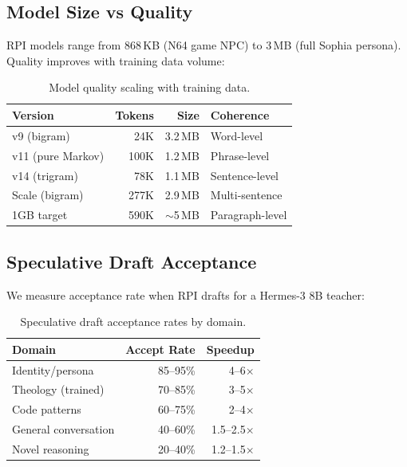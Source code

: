 \documentclass[10pt,twocolumn]{article}
\begin{document}
\subsection{Model Size vs Quality}

RPI models range from 868\,KB (N64 game NPC) to 3\,MB (full Sophia persona). Quality improves with training data volume:

\begin{table}[h]
\centering
\small
\begin{tabular}{lrrl}
\toprule
\textbf{Version} & \textbf{Tokens} & \textbf{Size} & \textbf{Coherence} \\
\midrule
v9 (bigram) & 24K & 3.2\,MB & Word-level \\
v11 (pure Markov) & 100K & 1.2\,MB & Phrase-level \\
v14 (trigram) & 78K & 1.1\,MB & Sentence-level \\
Scale (bigram) & 277K & 2.9\,MB & Multi-sentence \\
1GB target & 590K & $\sim$5\,MB & Paragraph-level \\
\bottomrule
\end{tabular}
\caption{Model quality scaling with training data.}
\label{tab:quality}
\end{table}

\subsection{Speculative Draft Acceptance}

We measure acceptance rate when RPI drafts for a Hermes-3 8B teacher:

\begin{table}[h]
\centering
\small
\begin{tabular}{lrr}
\toprule
\textbf{Domain} & \textbf{Accept Rate} & \textbf{Speedup} \\
\midrule
Identity/persona & 85--95\% & 4--6$\times$ \\
Theology (trained) & 70--85\% & 3--5$\times$ \\
Code patterns & 60--75\% & 2--4$\times$ \\
General conversation & 40--60\% & 1.5--2.5$\times$ \\
Novel reasoning & 20--40\% & 1.2--1.5$\times$ \\
\bottomrule
\end{tabular}
\caption{Speculative draft acceptance rates by domain.}
\label{tab:acceptance}
\end{table}
\end{document}
